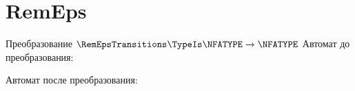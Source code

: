 \section{RemEps}
\begin{frame}{Преобразование $\RemEpsTransitions\TypeIs\NFATYPE\to\NFATYPE$}
	Автомат до преобразования:


	Автомат после преобразования:


\end{frame}
